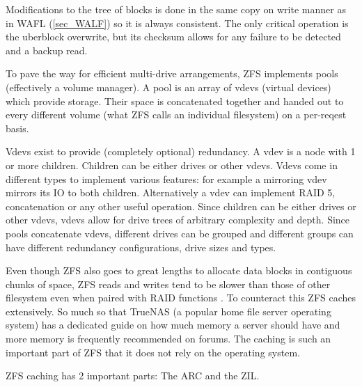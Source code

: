             Modifications to the tree of blocks is done in the same copy on
            write manner as in WAFL (\ref{sec_WALF}) so it is always
            consistent.  The only critical operation is the uberblock
            overwrite, but its checksum allows for any failure to be detected
            and a backup read.

            To pave the way for efficient multi-drive arrangements, ZFS
            implements pools (effectively a volume manager). A pool is an array
            of vdevs (virtual devices) which provide storage. Their space is
            concatenated together and handed out to every different volume
            (what ZFS calls an individual filesystem) on a per-reqest basis.

            Vdevs exist to provide (completely optional) redundancy. A vdev is
            a node with 1 or more children. Children can be either drives or
            other vdevs. Vdevs come in different types to implement various
            features: for example a mirroring vdev mirrors its IO to both
            children. Alternatively a vdev can implement RAID 5, concatenation
            or any other useful operation. Since children can be either drives
            or other vdevs, vdevs allow for drive trees of arbitrary complexity
            and depth. Since pools concatenate vdevs, different drives can be
            grouped and different groups can have different redundancy
            configurations, drive sizes and types.

            Even though ZFS also goes to great lengths to allocate data blocks
            in contiguous chunks of space, ZFS reads and writes tend to be
            slower than those of other filesystem even when paired with RAID
            functions \cite{i'm pretty sure someone somewhere said this}. To
            counteract this ZFS caches extensively. So much so that TrueNAS (a
            popular home file server operating system) has a dedicated guide on
            how much memory a server should have
            and more memory is frequently recommended on forums. The caching is
            such an important part of ZFS that it does not rely on the
            operating system.

            ZFS caching has 2 important parts: The ARC and the ZIL.

